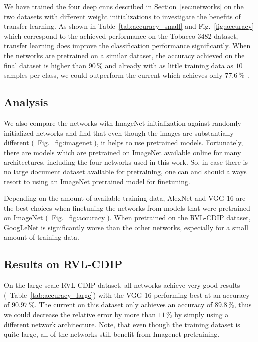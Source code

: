 We have trained the four deep \ac{cnn}s described in Section~\ref{sec:networks} on the two datasets with different weight initializations to investigate the benefits of transfer learning. As shown in Table~\ref{tab:accuracy_small} and Fig.~\ref{fig:accuracy} which correspond to the achieved performance on the Tobacco-3482 dataset, transfer learning does improve the classification performance significantly. When the networks are pretrained on a similar dataset, the accuracy achieved on the final dataset is higher than $90\,\%$ and already with as little training data as $10$ samples per class, we could outperform the current \sota which achieves only $77.6\,\%$~\cite{afzal2015deepdocclassifier}.


\subsection{Analysis}

We also compare the networks with ImageNet initialization against randomly initialized networks and find that even though the images are substantially different (\cf~Fig.~\ref{fig:imagenet}), it helps to use pretrained models. Fortunately, there are models which are pretrained on ImageNet available online for many architectures, including the four networks used in this work. So, in case there is no large document dataset available for pretraining, one can and should always resort to using an ImageNet pretrained model for finetuning.

Depending on the amount of available training data, AlexNet and VGG-16 are the best choices when finetuning the networks from models that were pretrained on ImageNet (\cf~Fig.~\ref{fig:accuracy}). When pretrained on the RVL-CDIP dataset, GoogLeNet is significantly worse than the other networks, especially for a small amount of training data.


\subsection{Results on RVL-CDIP}

On the large-scale RVL-CDIP dataset, all networks achieve very good results (\cf~Table~\ref{tab:accuracy_large}) with the VGG-16 performing best at an accuracy of $90.97\,\%$. The current \sota on this dataset only achieves an accuracy of $89.8\,\%$, thus we could decrease the relative error by more than $11\,\%$ by simply using a different network architecture.
Note, that even though the training dataset is quite large, all of the networks still benefit from Imagenet pretraining.

